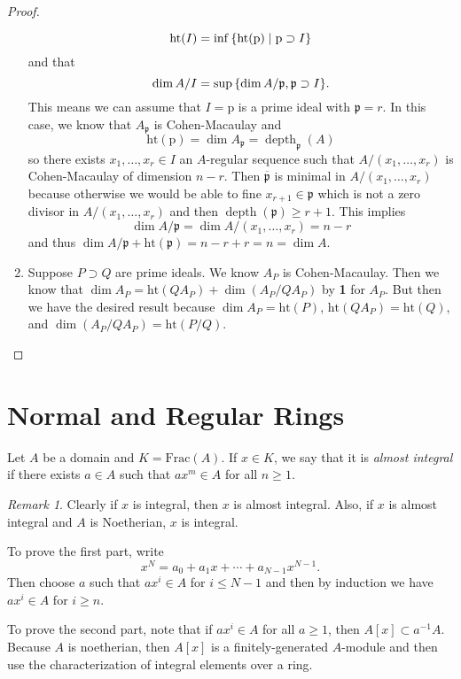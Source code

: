 \documentclass[leqno, openany]{memoir}
\theoremstyle{definition}
\theoremstyle{remark}
\newtheorem{rmk}[thm]{Remark}
\theoremstyle{plain}
\theoremstyle{definition}
\theoremstyle{remark}
\newcommand{\mf}[1]{\mathfrak{#1}}
\newcommand{\mr}[1]{\mathrm{#1}}
\newcommand{\ol}[1]{\overline{#1}}
\DeclareMathOperator{\dpth}{depth}
\begin{document}
\begin{proof}
\begin{enumerate}
            \[ \mr{ht}(I) = \inf \qty{\mr{ht}(\mr{p}) \mid \mr{p} \supset I} \]
            and that
            \[ \dim A/I = \sup \qty{ \dim A/\mf{p}, \mf{p} \supset I }. \]
            This means we can assume that $I = \mr{p}$ is a prime ideal with $\mf{p} = r$. In this case, we know that $A_{\mf{p}}$ is Cohen-Macaulay and 
            \[ \mr{ht}(\mr{p}) = \dim A_{\mf{p}} = \dpth_{\mf{p}} (A) \]
            so there exists $x_1, \ldots, x_r \in I$ an $A$-regular sequence such that $A/(x_1, \ldots, x_r)$ is Cohen-Macaulay of dimension $n-r$. Then $\ol{\mf{p}}$ is minimal in $A/(x_1, \ldots, x_r)$ because otherwise we would be able to fine $x_{r+1} \in \mf{p}$ which is not a zero divisor in $A/(x_1, \ldots, x_r)$ and then $\dpth(\mf{p}) \geq r+1$. This implies 
            \[ \dim A/\mf{p} = \dim A/(x_1, \ldots, x_r) = n-r \]
            and thus $\dim A/\mf{p} + \mr{ht}(\mf{p}) = n-r+r = n = \dim A$.
        \item Suppose $P \supset Q$ are prime ideals. We know $A_P$ is Cohen-Macaulay. Then we know that $\dim A_P = \mr{ht}(QA_P) + \dim (A_P / QA_P)$ by \textbf{1} for $A_P$. But then we have the desired result because $\dim A_P = \mr{ht}(P)$, $\mr{ht}(Q A_P) = \mr{ht}(Q)$, and $\dim (A_P / QA_P) = \mr{ht}(P/Q)$. \qedhere
    \end{enumerate}
\end{proof}


\section{Normal and Regular Rings}%
\label{sec:normal_rings}

Let $A$ be a domain and $K = \mr{Frac}(A)$. If $x \in K$, we say that it is \textit{almost integral} if there exists $a \in A$ such that $ax^m \in A$ for all $n \geq 1$.

\begin{rmk}
    Clearly if $x$ is integral, then $x$ is almost integral. Also, if $x$ is almost integral and $A$ is Noetherian, $x$ is integral.

    To prove the first part, write
    \[ x^N = a_0 + a_1 x + \cdots + a_{N-1}x^{N-1}. \]
    Then choose $a$ such that $a x^i \in A$ for $i \leq N-1$ and then by induction we have $ax^i \in A$ for $i \geq n$.

    To prove the second part, note that if $ax^i \in A$ for all $a \geq 1$, then $A[x] \subset a^{-1}A$. Because $A$ is noetherian, then $A[x]$ is a finitely-generated $A$-module and then use the characterization of integral elements over a ring.
\end{rmk}
\end{document}
